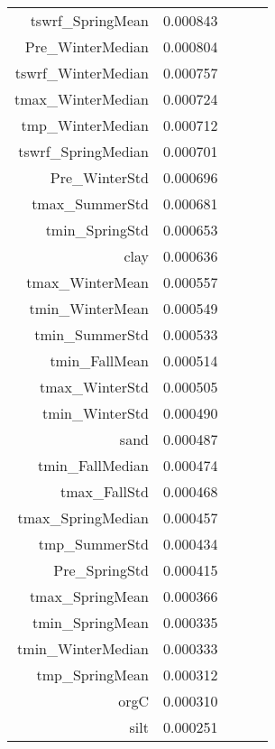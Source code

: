 \begin{tabular}{rrrrr}
tswrf_SpringMean & 0.000843 \\
Pre_WinterMedian & 0.000804 \\
tswrf_WinterMedian & 0.000757 \\
tmax_WinterMedian & 0.000724 \\
tmp_WinterMedian & 0.000712 \\
tswrf_SpringMedian & 0.000701 \\
Pre_WinterStd & 0.000696 \\
tmax_SummerStd & 0.000681 \\
tmin_SpringStd & 0.000653 \\
clay & 0.000636 \\
tmax_WinterMean & 0.000557 \\
tmin_WinterMean & 0.000549 \\
tmin_SummerStd & 0.000533 \\
tmin_FallMean & 0.000514 \\
tmax_WinterStd & 0.000505 \\
tmin_WinterStd & 0.000490 \\
sand & 0.000487 \\
tmin_FallMedian & 0.000474 \\
tmax_FallStd & 0.000468 \\
tmax_SpringMedian & 0.000457 \\
tmp_SummerStd & 0.000434 \\
Pre_SpringStd & 0.000415 \\
tmax_SpringMean & 0.000366 \\
tmin_SpringMean & 0.000335 \\
tmin_WinterMedian & 0.000333 \\
tmp_SpringMean & 0.000312 \\
orgC & 0.000310 \\
silt & 0.000251 \\
\bottomrule
\end{tabular}
